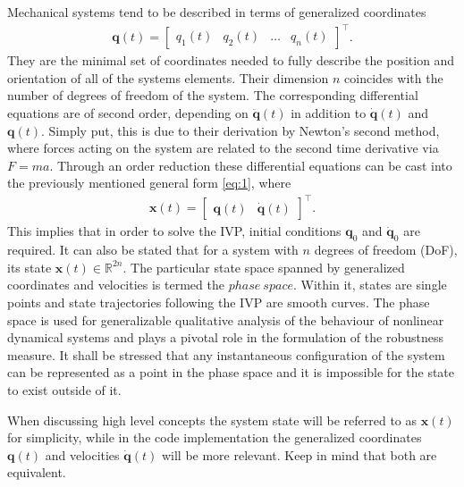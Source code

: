     Mechanical systems tend to be described in terms of generalized coordinates \begin{gather}\mathbf{q}(t)=\begin{bmatrix}q_1(t)&q_2(t)&\ldots&q_n(t) \end{bmatrix}^\intercal . \end{gather} They are the minimal set of coordinates needed to fully describe the position and orientation of all of the systems elements. Their dimension $n$ coincides with the number of degrees of freedom of the system. The corresponding differential equations are of second order, depending on $\ddot{\mathbf{q}}(t)$ in addition to $\dot{\mathbf{q}}(t)$ and $\mathbf{q}(t)$. Simply put, this is due to their derivation by Newton's second method, where forces acting on the system are related to the second time derivative via $F = ma$.
    Through an order reduction these differential equations can be cast into the previously mentioned general form \ref{eq:1}, where \begin{gather*} \mathbf{x}(t) = \begin{bmatrix}\mathbf{q}(t)&\dot{\mathbf{q}}(t)\end{bmatrix}^\intercal .\end{gather*}
    This implies that in order to solve the IVP, initial conditions $\mathbf{q}_0$ and $\dot{\mathbf{q}}_0$ are required. It can also be stated that for a system with $n$ degrees of freedom (DoF), its state $\mathbf{x}(t) \in \mathbb{R}^{2n}$. The particular state space spanned by generalized coordinates and velocities is termed the $phase\ space$. Within it, states are single points and state trajectories following the IVP are smooth curves. The phase space is used for generalizable qualitative analysis of the behaviour of nonlinear dynamical systems and plays a pivotal role in the formulation of the robustness measure. It shall be stressed that any instantaneous configuration of the system can be represented as a point in the phase space and it is impossible for the state to exist outside of it. 

    When discussing high level concepts the system state will be referred to as $\mathbf{x}(t)$ for simplicity, while in the code implementation the generalized coordinates $\mathbf{q}(t)$ and velocities $\dot{\mathbf{q}}(t)$ will be more relevant. Keep in mind that both are equivalent.









